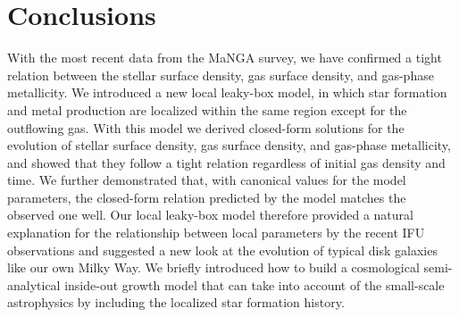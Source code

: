 \documentclass[12pt, appendixfloats, numberedappendix]{emulateapj}
\begin{document}

\section{Conclusions}\label{sec:summary}

With the most recent data from the MaNGA survey, we have confirmed a tight relation between the stellar surface density, 
gas surface density, and gas-phase metallicity. 
We introduced a new local leaky-box model, in which star formation and metal production are localized 
within the same region except for the outflowing gas. 
With this model we derived closed-form solutions for the evolution of stellar surface density, gas surface density, and gas-phase metallicity, 
and showed that they follow a tight relation regardless of initial gas density and time. 
We further demonstrated that, with canonical values for the model parameters, the closed-form relation predicted by the model 
matches the observed one well. Our local leaky-box model therefore provided a natural explanation for the relationship between 
local parameters by the recent IFU observations and suggested a new look at the evolution of typical disk galaxies like our own Milky Way.
We briefly introduced how to build a cosmological semi-analytical inside-out growth model that can take into account
of the small-scale astrophysics by including the localized star formation history.
\end{document}
